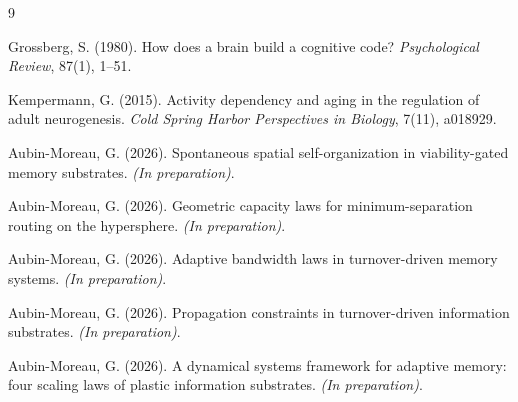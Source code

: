\documentclass[11pt,twocolumn]{article}
\begin{document}
\begin{thebibliography}{9}

Grossberg, S. (1980).
How does a brain build a cognitive code?
\emph{Psychological Review}, 87(1), 1--51.

Kempermann, G. (2015).
Activity dependency and aging in the regulation of adult neurogenesis.
\emph{Cold Spring Harbor Perspectives in Biology}, 7(11), a018929.

Aubin-Moreau, G. (2026).
Spontaneous spatial self-organization in viability-gated memory substrates.
\emph{(In preparation)}.

Aubin-Moreau, G. (2026).
Geometric capacity laws for minimum-separation routing on the hypersphere.
\emph{(In preparation)}.

Aubin-Moreau, G. (2026).
Adaptive bandwidth laws in turnover-driven memory systems.
\emph{(In preparation)}.

Aubin-Moreau, G. (2026).
Propagation constraints in turnover-driven information substrates.
\emph{(In preparation)}.

Aubin-Moreau, G. (2026).
A dynamical systems framework for adaptive memory: four scaling laws of plastic information substrates.
\emph{(In preparation)}.

\end{thebibliography}
\end{document}

